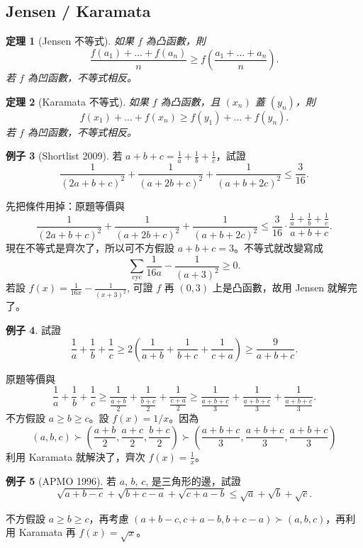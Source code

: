 \documentclass[11pt,nothm]{scrartcl}
\newtheorem{theorem}{\color{blue!40!black}定理}
\theoremstyle{definition}
\newtheorem{example}[theorem]{\color{blue!40!black}例子}
\let\oldendproof\endproof
\renewenvironment{proof}[1][【證】]{%
  \oldproof[\bfseries #1\nopunct]%
}{\oldendproof}
\begin{document}
\subsection{Jensen / Karamata}
\begin{theorem}
  [Jensen 不等式] 如果 $f$ 為凸函數，則
  \[ \frac{f(a_1) + \dots + f(a_n)}{n} \ge f\left( \frac{a_1+\dots+a_n}{n} \right). \]
  若 $f$ 為凹函數，不等式相反。
\end{theorem}
\begin{theorem}
  [Karamata 不等式] 如果 $f$ 為凸函數，且 $(x_n)$ 蓋 $(y_n)$，則
  \[ f(x_1) + \dots + f(x_n) \ge f(y_1) + \dots + f(y_n). \]
  若 $f$ 為凹函數，不等式相反。
\end{theorem}
\begin{example}
  [Shortlist 2009] 若 $a+b+c=\frac1a+\frac1b+\frac1c$，試證
  \[ \frac{1}{(2a+b+c)^2}+\frac{1}{(a+2b+c)^2}+\frac{1}{(a+b+2c)^2}\leq\frac{3}{16}. \]
\end{example}
\begin{proof}
  先把條件用掉：原題等價與
  \[ \frac{1}{(2a+b+c)^2}+\frac{1}{(a+2b+c)^2}+\frac{1}{(a+b+2c)^2}\leq\frac{3}{16} \cdot \frac{\frac1a+\frac1b+\frac1c}{a+b+c}. \]
  現在不等式是齊次了，所以可不方假設 $a+b+c=3$。不等式就改變寫成
  \[ \sum_{\text{cyc}} \frac{1}{16a} - \frac{1}{(a+3)^2} \ge 0. \]
  若設 $f(x) = \frac{1}{16x} - \frac{1}{(x+3)^2}$, 可證 $f$ 再 $(0,3)$ 上是凸函數，故用 Jensen 就解完了。
\end{proof}
\begin{example}
  試證 \[ \frac{1}{a}+\frac{1}{b}+\frac{1}{c}\geq2\left(\frac{1}{a+b}+\frac{1}{b+c}+\frac{1}{c+a}\right)\geq\frac{9}{a+b+c}. \]
\end{example}
\begin{proof}
  原題等價與
  \[ \frac{1}{a} + \frac{1}{b} + \frac{1}{c} \ge \frac{1}{\frac{a+b}{2}} + \frac{1}{\frac{b+c}{2}} + \frac{1}{\frac{c+a}{2}} \ge \frac{1}{\frac{a+b+c}{3}} + \frac{1}{\frac{a+b+c}{3}} + \frac{1}{\frac{a+b+c}{3}}. \]
  不方假設 $a \ge b \ge c$。設 $f(x) = 1/x$。因為
  \[ (a,b,c) \succ \left( \frac{a+b}{2}, \frac{a+c}{2}, \frac{b+c}{2} \right) \succ \left( \frac{a+b+c}{3}, \frac{a+b+c}{3}, \frac{a+b+c}{3} \right) \]
  利用 Karamata 就解決了，齊次 $f(x) = \frac 1x$。
\end{proof}
\begin{example}
  [APMO 1996] 若 $a$, $b$, $c$, 是三角形的邊，試證 \[ \sqrt{a+b-c}+\sqrt{b+c-a}+\sqrt{c+a-b}\leq\sqrt{a}+\sqrt{b}+\sqrt{c}. \]
\end{example}
\begin{proof}
  不方假設 $a \ge b \ge c$，再考慮 $(a+b-c, c+a-b, b+c-a) \succ (a,b,c)$，再利用 Karamata 再 $f(x) = \sqrt x$。
\end{proof}
\end{document}
